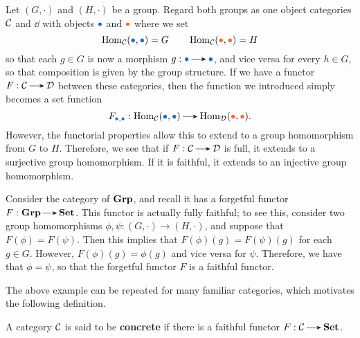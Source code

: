     \begin{example}
        Let $(G, \cdot)$ and  $(H, \cdot)$ be a group. 
        Regard both groups as one object categories $\mathcal{C}$ and $\dd$
        with objects $\textcolor{NavyBlue}{\bullet}$ and $\textcolor{Orange}{\bullet}$ 
        where we set 
        \[
            \hom_{\cc}(\textcolor{NavyBlue}{\bullet}, \textcolor{NavyBlue}{\bullet}) = G
            \qquad
            \hom_{\cc}(\textcolor{Orange}{\bullet}, \textcolor{Orange}{\bullet}) = H
        \]
        so that each $g \in G$ is now a morphism $g: \textcolor{NavyBlue}{\bullet} \to \textcolor{NavyBlue}{\bullet}$, 
        and vice versa for every $h \in G$, so that composition is given by the group structure.
        If we have a functor $F: \cc \to \dd$ between these categories, 
        then the function we introduced simply becomes a set function 
        \[
            F_{\textcolor{NavyBlue}{\bullet}, \textcolor{NavyBlue}{\bullet}}
            : 
            \hom_{\cc}(\textcolor{NavyBlue}{\bullet}, \textcolor{NavyBlue}{\bullet})
            \to 
            \hom_{\dd}(\textcolor{Orange}{\bullet}, \textcolor{Orange}{\bullet}).
        \]
        However, the functorial properties allow this to extend to a group homomorphism
        from $G$ to $H$.
        Therefore, we see that if $F: \cc \to \dd$ is full, it extends to a surjective 
        group homomorphism. If it is faithful, it extends to an injective group homomorphism. 
    \end{example}

    \begin{example}
        Consider the category of $\operatorname{\mathbf{Grp}}$, and recall it has a 
        forgetful functor $F: \grp \to \Set$. This functor is actually 
        fully faithful; to see this, consider two group homomorphisms 
        $\phi,\psi: (G, \cdot) \to (H, \cdot)$, and suppose that 
        $F(\phi) = F(\psi)$. Then this implies that 
        $F(\phi)(g) = F(\psi)(g)$ for each $g \in G$. However, 
        $F(\phi)(g) = \phi(g)$ and vice versa for $\psi$. Therefore, we 
        have that $\phi = \psi$, so that the forgetful functor $F$ is a 
        faithful functor. 
    \end{example}

    The above example can be repeated for many familiar categories, which motivates the 
    following definition. 
    
    \begin{definition}
        A category $\mathcal{C}$ is said to be \textbf{concrete} if there is a faithful 
        functor $F: \cc \to \Set$.
    \end{definition}

